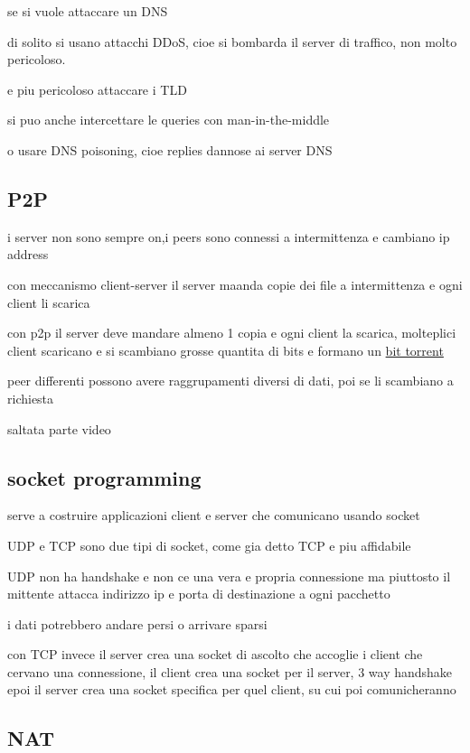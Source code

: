 \documentclass[12pt]{article}
\begin{document}
se si vuole attaccare un DNS

di solito si usano attacchi DDoS, cioe si bombarda il server di traffico, non molto pericoloso.

e piu pericoloso attaccare i TLD


si puo anche intercettare le queries con man-in-the-middle

o usare DNS poisoning, cioe replies dannose ai server DNS


\subsection{P2P}

i server non sono sempre on,i peers sono connessi a intermittenza e cambiano ip address

con meccanismo client-server il server maanda copie dei file a intermittenza e ogni client li scarica

con p2p il server deve mandare almeno 1 copia e ogni client la scarica, molteplici client scaricano e si scambiano grosse quantita di bits e formano un \underline{bit torrent}

peer differenti possono avere raggrupamenti diversi di dati, poi se li scambiano a richiesta

saltata parte video

\subsection{socket programming}

serve a costruire applicazioni client e server che comunicano usando socket

UDP e TCP sono due tipi di socket, come gia detto TCP e piu affidabile

UDP non ha handshake e non ce una vera e propria connessione ma piuttosto il mittente attacca indirizzo ip e porta di destinazione a ogni pacchetto

i dati potrebbero andare persi o arrivare sparsi


con TCP invece il server crea una socket di ascolto che accoglie i client che cervano una connessione, il client crea una socket per il server, 3 way handshake  epoi il server crea una socket specifica per quel client, su cui poi comunicheranno


\subsection{NAT}
\end{document}
